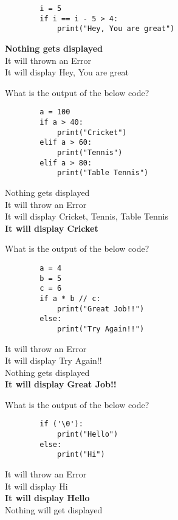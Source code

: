 \documentclass{exam}
\begin{document}
\begin{questions}
    \begin{verbatim}
        i = 5
        if i == i - 5 > 4:
            print("Hey, You are great")
    \end{verbatim}
    \begin{oneparchoices}
        \choice \textbf{Nothing gets displayed} \\
        \choice It will thrown an Error \\
        \choice It will display Hey, You are great \\
    \end{oneparchoices}

    \question What is the output of the below code?

    \begin{verbatim}
        a = 100
        if a > 40:
            print("Cricket")
        elif a > 60:
            print("Tennis")
        elif a > 80:
            print("Table Tennis")
    \end{verbatim}

    \begin{oneparchoices}
        \choice Nothing gets displayed \\
        \choice It will throw an Error \\
        \choice It will display Cricket, Tennis, Table Tennis \\
        \choice \textbf{It will display Cricket}
    \end{oneparchoices}

    \question What is the output of the below code?

    \begin{verbatim}
        a = 4
        b = 5
        c = 6
        if a * b // c:
            print("Great Job!!")
        else:
            print("Try Again!!")
    \end{verbatim}

    \begin{oneparchoices}
        \choice It will throw an Error \\
        \choice It will display Try Again!! \\
        \choice Nothing gets displayed \\
        \choice \textbf{It will display Great Job!!}
    \end{oneparchoices}
    
    \question What is the output of the below code?

    \begin{verbatim}
        if ('\0'):
            print("Hello")
        else:
            print("Hi")
    \end{verbatim}
    \begin{oneparchoices}
        \choice It will throw an Error \\
        \choice It will display Hi \\
        \choice \textbf{It will display Hello} \\
        \choice Nothing will get displayed
    \end{oneparchoices}


\end{questions}
\end{document}
